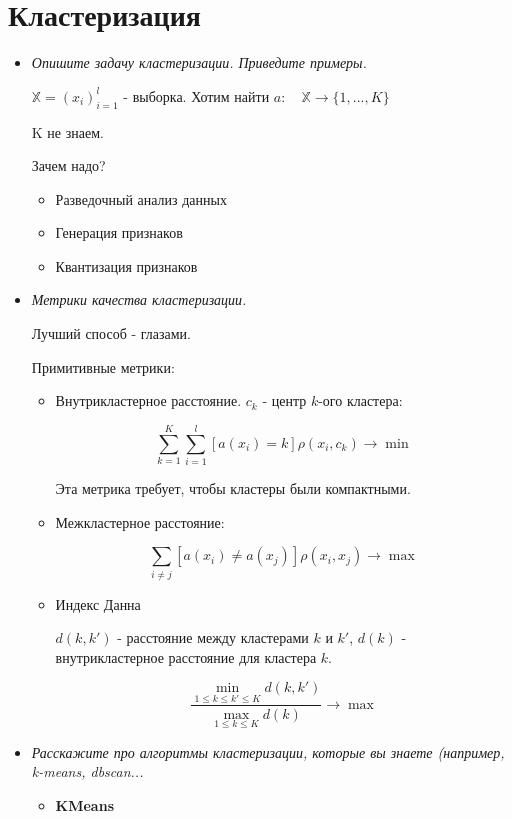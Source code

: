 \documentclass[a4paper]{article}
\begin{document}
\section*{Кластеризация}

\begin{itemize}
\item \textit{Опишите задачу кластеризации. Приведите примеры.}

$\mathbb{X} = (x_i)_{i=1}^l$ - выборка.
Хотим найти $a: \quad \mathbb{X} \rightarrow \{ 1, ..., K \}$

K не знаем.

Зачем надо?
\begin{itemize}
\item Разведочный анализ данных
\item Генерация признаков
\item Квантизация признаков
\end{itemize}

\item \textit{ Метрики качества кластеризации.}

Лучший способ - глазами.

Примитивные метрики:
\begin{itemize}
\item Внутрикластерное расстояние.
$c_k$ - центр $k$-ого кластера:

\[ \sum_{k=1}^K \sum_{i=1}^l [a(x_i) = k] \rho (x_i, c_k) \rightarrow \min \]

Эта метрика требует, чтобы кластеры были компактными.

\item Межкластерное расстояние:

\[ \sum_{i \neq j} [a(x_i) \neq a(x_j)] \rho(x_i, x_j) \rightarrow \max \]

\item Индекс Данна

$d(k, k')$ - расстояние между кластерами $k$ и $k'$, $d(k)$ - внутрикластерное расстояние для кластера $k$.


\[
\frac{\min_{1 \leq k \leq k' \leq K} d(k, k')}{\max_{1 \leq k \leq K} d(k)} \rightarrow \max
\]
\end{itemize}

\item \textit{Расскажите про алгоритмы кластеризации, которые вы знаете (например, k-means,
dbscan...}

\begin{itemize}

\item \textbf{KMeans}


\end{itemize}
\end{itemize}
\end{document}
